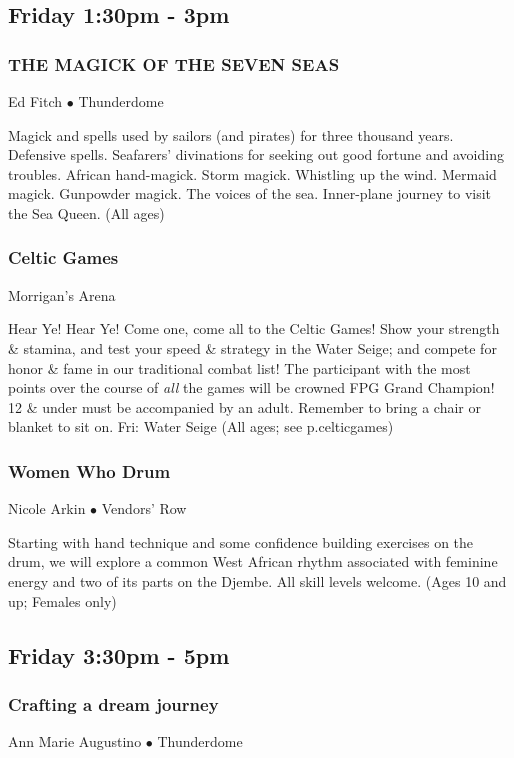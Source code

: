 \subsection{Friday 1:30pm - 3pm}

\subsubsection{THE MAGICK OF THE SEVEN SEAS}
\label{Fri-Fitch2}
{\small Ed Fitch $\bullet$  Thunderdome}

 Magick and spells used by sailors (and pirates) for three thousand years. Defensive spells. Seafarers' divinations for seeking out good fortune and avoiding troubles. African hand-magick. Storm magick. Whistling up the wind. Mermaid magick. Gunpowder magick. The voices of the sea. Inner-plane journey to visit the Sea Queen. {\small (All ages)}

\subsubsection{Celtic Games}
\label{Fri-Celts2}
{\small  Morrigan's Arena}

 Hear Ye! Hear Ye! Come one, come all to the Celtic Games! Show your 
strength \& stamina, and test your speed \& strategy in the Water 
Seige; and compete for honor \& fame in our traditional combat list! 
 The participant with the most points over the course of \textit{all} 
the games will be crowned FPG Grand Champion! 12 \& under must be 
accompanied by an adult.  Remember to bring a chair or blanket to sit 
on.  Fri: Water Seige {\small (All ages; see p.{celticgames})}

\subsubsection{Women Who Drum}
\label{Fri-Arkin1}
{\small Nicole Arkin $\bullet$  Vendors' Row}

 Starting with hand technique and some confidence building exercises on the drum, we will explore a common West African rhythm associated with feminine energy and two of its parts on the Djembe. All skill levels welcome. {\small (Ages 10 and up; Females only)}

\subsection{Friday 3:30pm - 5pm}

\subsubsection{Crafting a dream journey}
\label{Fri-AMA1}
{\small Ann Marie Augustino $\bullet$  Thunderdome}

